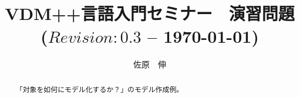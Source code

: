 \documentclass[a4paper,10pt]{jsarticle}
\begin{document}

\title{VDM++言語入門セミナー　演習問題\\
\small{($Revision: 0.3 $ -- \today)}}
\author{佐原　伸\\
}
\date{\mbox{}}
\maketitle

\begin{abstract}
\setlength{\baselineskip}{12pt plus .1pt}
「対象を如何にモデル化するか？」のモデル作成例。
\end{abstract}

\tableofcontents









%
%
%
\end{document}
